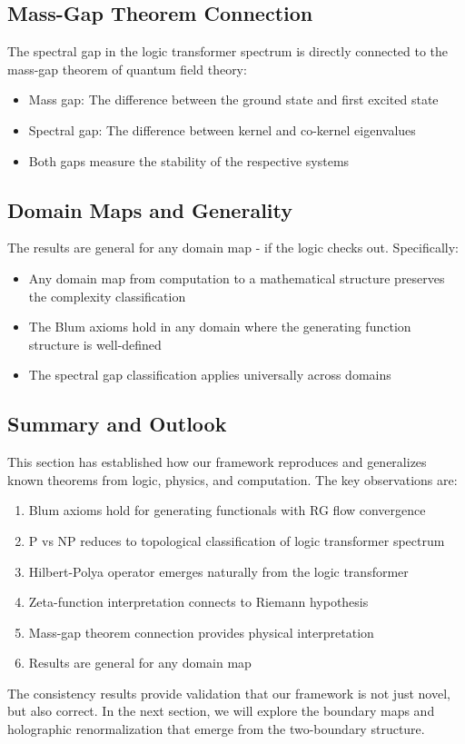 \subsection{Mass-Gap Theorem Connection}

\begin{remark}
\label{rem:mass-gap}
The spectral gap in the logic transformer spectrum is directly connected to the mass-gap theorem of quantum field theory:
\begin{itemize}
\item Mass gap: The difference between the ground state and first excited state
\item Spectral gap: The difference between kernel and co-kernel eigenvalues
\item Both gaps measure the stability of the respective systems
\end{itemize}
\end{remark}

\subsection{Domain Maps and Generality}

\begin{theorem}
\label{thm:domain-generality}
The results are general for any domain map - if the logic checks out. Specifically:
\begin{itemize}
\item Any domain map from computation to a mathematical structure preserves the complexity classification
\item The Blum axioms hold in any domain where the generating function structure is well-defined
\item The spectral gap classification applies universally across domains
\end{itemize}
\end{theorem}

\subsection{Summary and Outlook}

This section has established how our framework reproduces and generalizes known theorems from logic, physics, and computation. The key observations are:

\begin{enumerate}
\item Blum axioms hold for generating functionals with RG flow convergence
\item P vs NP reduces to topological classification of logic transformer spectrum
\item Hilbert-Polya operator emerges naturally from the logic transformer
\item Zeta-function interpretation connects to Riemann hypothesis
\item Mass-gap theorem connection provides physical interpretation
\item Results are general for any domain map
\end{enumerate}

The consistency results provide validation that our framework is not just novel, but also correct. In the next section, we will explore the boundary maps and holographic renormalization that emerge from the two-boundary structure.
